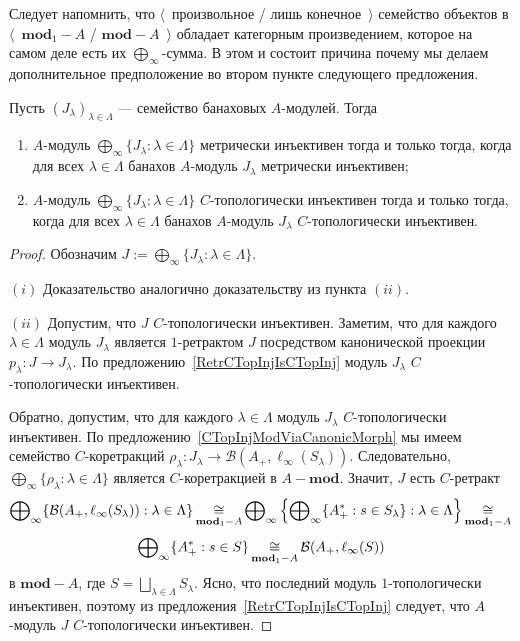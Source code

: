 Следует напомнить, что $\langle$~произвольное / лишь конечное~$\rangle$
семейство объектов в $\langle$~$\mathbf{mod}_1-A$ / $\mathbf{mod}-A$~$\rangle$
обладает категорным произведением, которое на самом деле есть их
$\bigoplus_\infty$-сумма. В этом и состоит причина почему мы делаем
дополнительное предположение во втором пункте следующего предложения.

\begin{proposition}\label{MetTopInjModProd} Пусть
${(J_\lambda)}_{\lambda\in\Lambda}$ --- семейство банаховых $A$-модулей. Тогда 
\begin{enumerate}[label = (\roman*)]
    \item $A$-модуль $\bigoplus_\infty \{J_\lambda:\lambda\in\Lambda \}$
    метрически инъективен тогда и только тогда, когда для всех
    $\lambda\in\Lambda$ банахов $A$-модуль $J_\lambda$ метрически инъективен;

    \item $A$-модуль $\bigoplus_\infty \{J_\lambda:\lambda\in\Lambda \}$
    $C$-топологически инъективен тогда и только тогда, когда для всех
    $\lambda\in\Lambda$ банахов $A$-модуль $J_\lambda$ $C$-топологически
    инъективен.
\end{enumerate}
\end{proposition}
\begin{proof} Обозначим $J:=\bigoplus_\infty \{J_\lambda:\lambda\in\Lambda \}$.

$(i)$ Доказательство аналогично доказательству из пункта $(ii)$.

$(ii)$ Допустим, что $J$ $C$-топологически инъективен. Заметим, что для каждого
$\lambda\in\Lambda$ модуль $J_\lambda$ является $1$-ретрактом $J$ посредством
канонической проекции $p_\lambda:J\to J_\lambda$. По
предложению~\ref{RetrCTopInjIsCTopInj} модуль $J_\lambda$ $C$-топологически
инъективен.

Обратно, допустим, что для каждого $\lambda\in\Lambda$ модуль $J_\lambda$
$C$-топологически инъективен. По предложению~\ref{CTopInjModViaCanonicMorph} мы
имеем семейство $C$-коретракций
$\rho_\lambda:J_\lambda\to\mathcal{B}(A_+,\ell_\infty(S_\lambda))$.
Следовательно, $\bigoplus_\infty \{\rho_\lambda:\lambda\in\Lambda \}$ является
$C$-коретракцией в $A-\mathbf{mod}$. Значит, $J$ есть $C$-ретракт 
$$
\bigoplus\nolimits_\infty \{
    \mathcal{B}(A_+,\ell_\infty(S_\lambda)):\lambda\in\Lambda \}
\mathop{\mathbin{\cong}}\limits_{\mathbf{mod}_1-A}
\bigoplus\nolimits_\infty\left \{
    \bigoplus\nolimits_\infty \{ 
        A_+^*:s\in S_\lambda \}:\lambda\in\Lambda\right \}
\mathop{\mathbin{\cong}}\limits_{\mathbf{mod}_1-A}
$$
$$
\bigoplus\nolimits_\infty \{A_+^*:s\in S \}
\mathop{\mathbin{\cong}}\limits_{\mathbf{mod}_1-A}
\mathcal{B}(A_+,\ell_\infty(S))
$$
в $\mathbf{mod}-A$, где $S=\bigsqcup_{\lambda\in\Lambda}S_\lambda$. Ясно, что
последний модуль $1$-топологически инъективен, поэтому из
предложения~\ref{RetrCTopInjIsCTopInj} следует, что $A$-модуль $J$
$C$-топологически инъективен.
\end{proof}

